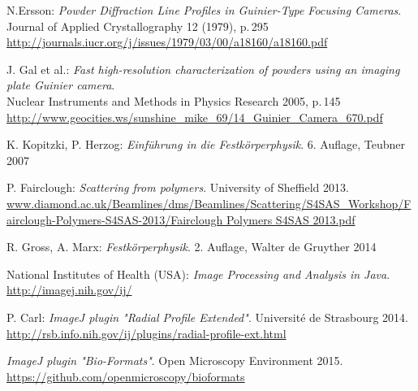 \documentclass[a4paper, parskip=half, 12pt, bibliography=totocnumbered]{scrartcl}
\begin{document}





\begin{thebibliography}{10}
N.Ersson: \emph{Powder Diffraction Line Profiles in Guinier-Type Focusing Cameras}.\\
Journal of Applied Crystallography 12 (1979), p.\,295\\
\url{http://journals.iucr.org/j/issues/1979/03/00/a18160/a18160.pdf}

J. Gal et al.: \emph{Fast high-resolution characterization of powders using an imaging plate Guinier camera}.\\
Nuclear Instruments and Methods in Physics Research 2005, p.\,145\\
\url{http://www.geocities.ws/sunshine_mike_69/14_Guinier_Camera_670.pdf}

K. Kopitzki, P. Herzog: \emph{Einführung in die Festkörperphysik}. 6. Auflage, Teubner 2007

P. Fairclough: \emph{Scattering from polymers}. University of Sheffield 2013.\\
\url{www.diamond.ac.uk/Beamlines/dms/Beamlines/Scattering/S4SAS_Workshop/Fairclough-Polymers-S4SAS-2013/Fairclough Polymers S4SAS 2013.pdf}

R. Gross, A. Marx: \emph{Festkörperphysik}. 2. Auflage, Walter de Gruyther 2014

 National Institutes of Health (USA): \emph{Image Processing and Analysis in Java}.\\
\url{http://imagej.nih.gov/ij/}

P. Carl: \emph{ImageJ plugin "Radial Profile Extended"}. Université de Strasbourg 2014.\\
\url{http://rsb.info.nih.gov/ij/plugins/radial-profile-ext.html}

\emph{ImageJ plugin "Bio-Formats"}. Open Microscopy Environment 2015.\\
\url{https://github.com/openmicroscopy/bioformats}

\end{thebibliography}
\end{document}
